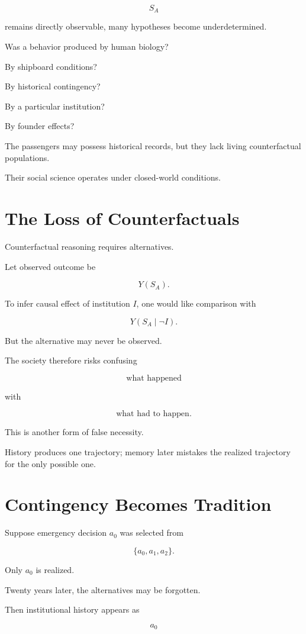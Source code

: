 \documentclass[11pt,oneside]{book}
\theoremstyle{definition}
\theoremstyle{remark}
\begin{document}
\[
S_A
\]

remains directly observable, many hypotheses become underdetermined.

Was a behavior produced by human biology?

By shipboard conditions?

By historical contingency?

By a particular institution?

By founder effects?

The passengers may possess historical records, but they lack living counterfactual populations.

Their social science operates under closed-world conditions.

\section{The Loss of Counterfactuals}

Counterfactual reasoning requires alternatives.

Let observed outcome be

\[
Y(S_A).
\]

To infer causal effect of institution \(I\), one would like comparison with

\[
Y(S_A\mid\neg I).
\]

But the alternative may never be observed.

The society therefore risks confusing

\[
\text{what happened}
\]

with

\[
\text{what had to happen}.
\]

This is another form of false necessity.

History produces one trajectory; memory later mistakes the realized trajectory for the only possible one.

\section{Contingency Becomes Tradition}

Suppose emergency decision \(a_0\) was selected from

\[
\{a_0,a_1,a_2\}.
\]

Only \(a_0\) is realized.

Twenty years later, the alternatives may be forgotten.

Then institutional history appears as

\[
a_0
\]
\end{document}
